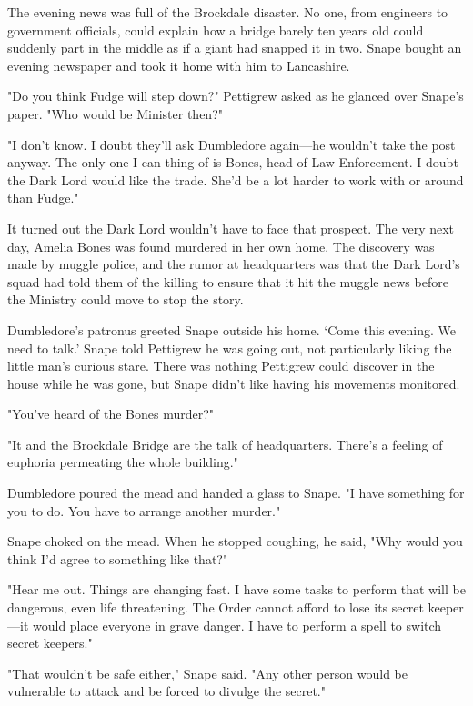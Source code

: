 The evening news was full of the Brockdale disaster. No one, from engineers to government officials, could explain how a bridge barely ten years old could suddenly part in the middle as if a giant had snapped it in two. Snape bought an evening newspaper and took it home with him to Lancashire.

"Do you think Fudge will step down?" Pettigrew asked as he glanced over Snape's paper. "Who would be Minister then?"

"I don't know. I doubt they'll ask Dumbledore again—he wouldn't take the post anyway. The only one I can thing of is Bones, head of Law Enforcement. I doubt the Dark Lord would like the trade. She'd be a lot harder to work with or around than Fudge."

It turned out the Dark Lord wouldn't have to face that prospect. The very next day, Amelia Bones was found murdered in her own home. The discovery was made by muggle police, and the rumor at headquarters was that the Dark Lord's squad had told them of the killing to ensure that it hit the muggle news before the Ministry could move to stop the story.

Dumbledore's patronus greeted Snape outside his home. `Come this evening. We need to talk.' Snape told Pettigrew he was going out, not particularly liking the little man's curious stare. There was nothing Pettigrew could discover in the house while he was gone, but Snape didn't like having his movements monitored.

\sbreak

"You've heard of the Bones murder?"

"It and the Brockdale Bridge are the talk of headquarters. There's a feeling of euphoria permeating the whole building."

Dumbledore poured the mead and handed a glass to Snape. "I have something for you to do. You have to arrange another murder."

Snape choked on the mead. When he stopped coughing, he said, "Why would you think I'd agree to something like that?"

"Hear me out. Things are changing fast. I have some tasks to perform that will be dangerous, even life threatening. The Order cannot afford to lose its secret keeper—it would place everyone in grave danger. I have to perform a spell to switch secret keepers."

"That wouldn't be safe either," Snape said. "Any other person would be vulnerable to attack and be forced to divulge the secret."

